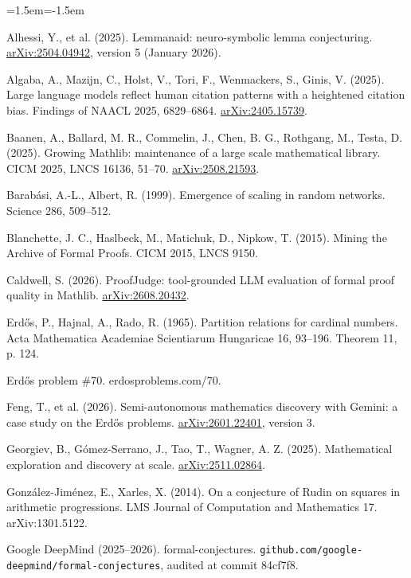 \documentclass[11pt,a4paper]{article}
\begin{document}
\begin{list}{}{\leftmargin=1.5em\itemindent=-1.5em\itemsep=2pt}
\item
  Alhessi, Y., et al. (2025). Lemmanaid: neuro-symbolic lemma conjecturing. \href{https://arxiv.org/abs/2504.04942}{arXiv:2504.04942}, version 5 (January 2026).
\item
  Algaba, A., Mazijn, C., Holst, V., Tori, F., Wenmackers, S., Ginis, V. (2025). Large language models reflect human citation patterns with a heightened citation bias. Findings of NAACL 2025, 6829--6864. \href{https://arxiv.org/abs/2405.15739}{arXiv:2405.15739}.
\item
  Baanen, A., Ballard, M. R., Commelin, J., Chen, B. G., Rothgang, M., Testa, D. (2025). Growing Mathlib: maintenance of a large scale mathematical library. CICM 2025, LNCS 16136, 51--70. \href{https://arxiv.org/abs/2508.21593}{arXiv:2508.21593}.
\item
  Barabási, A.-L., Albert, R. (1999). Emergence of scaling in random networks. Science 286, 509--512.
\item
  Blanchette, J. C., Haslbeck, M., Matichuk, D., Nipkow, T. (2015). Mining the Archive of Formal Proofs. CICM 2015, LNCS 9150.
\item
  Caldwell, S. (2026). ProofJudge: tool-grounded LLM evaluation of formal proof quality in Mathlib. \href{https://arxiv.org/abs/2608.20432}{arXiv:2608.20432}.
\item
  Erdős, P., Hajnal, A., Rado, R. (1965). Partition relations for cardinal numbers. Acta Mathematica Academiae Scientiarum Hungaricae 16, 93--196. Theorem 11, p. 124.
\item
  Erdős problem \#70. erdosproblems.com/70.
\item
  Feng, T., et al. (2026). Semi-autonomous mathematics discovery with Gemini: a case study on the Erdős problems. \href{https://arxiv.org/abs/2601.22401}{arXiv:2601.22401}, version 3.
\item
  Georgiev, B., Gómez-Serrano, J., Tao, T., Wagner, A. Z. (2025). Mathematical exploration and discovery at scale. \href{https://arxiv.org/abs/2511.02864}{arXiv:2511.02864}.
\item
  González-Jiménez, E., Xarles, X. (2014). On a conjecture of Rudin on squares in arithmetic progressions. LMS Journal of Computation and Mathematics 17. arXiv:1301.5122.
\item
  Google DeepMind (2025--2026). formal-conjectures. \nolinkurl{github.com/google-deepmind/formal-conjectures}, audited at commit 84cf7f8.
\item

\end{list}
\end{document}
